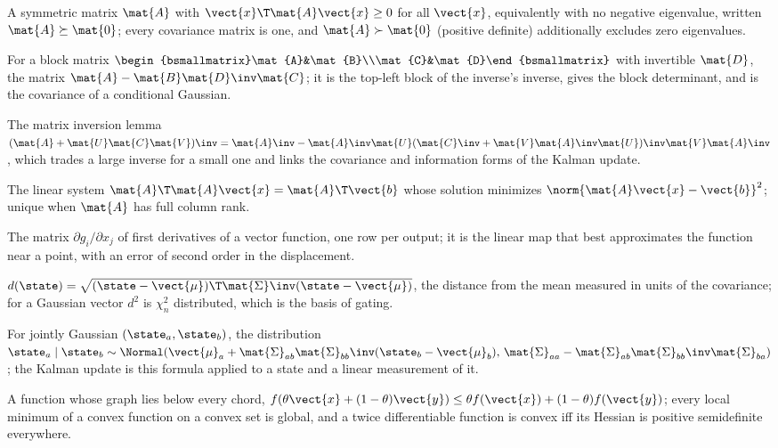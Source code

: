 \item[Positive semidefinite matrix] A symmetric matrix $\mat{A}$ with $\vect{x}\T\mat{A}\vect{x}\ge0$ for all $\vect{x}$, equivalently with no negative eigenvalue, written $\mat{A}\succeq\mat{0}$; every covariance matrix is one, and $\mat{A}\succ\mat{0}$ (positive definite) additionally excludes zero eigenvalues.
\item[Schur complement] For a block matrix $\begin{bsmallmatrix}\mat{A}&\mat{B}\\\mat{C}&\mat{D}\end{bsmallmatrix}$ with invertible $\mat{D}$, the matrix $\mat{A}-\mat{B}\mat{D}\inv\mat{C}$; it is the top-left block of the inverse's inverse, gives the block determinant, and is the covariance of a conditional Gaussian.
\item[Woodbury identity] The matrix inversion lemma $(\mat{A}+\mat{U}\mat{C}\mat{V})\inv=\mat{A}\inv-\mat{A}\inv\mat{U}(\mat{C}\inv+\mat{V}\mat{A}\inv\mat{U})\inv\mat{V}\mat{A}\inv$, which trades a large inverse for a small one and links the covariance and information forms of the Kalman update.
\item[Normal equations] The linear system $\mat{A}\T\mat{A}\vect{x}=\mat{A}\T\vect{b}$ whose solution minimizes $\norm{\mat{A}\vect{x}-\vect{b}}^2$; unique when $\mat{A}$ has full column rank.
\item[Jacobian] The matrix $\partial g_i/\partial x_j$ of first derivatives of a vector function, one row per output; it is the linear map that best approximates the function near a point, with an error of second order in the displacement.
\item[Mahalanobis distance] $d(\state)=\sqrt{(\state-\vect{\mu})\T\mat{\Sigma}\inv(\state-\vect{\mu})}$, the distance from the mean measured in units of the covariance; for a Gaussian vector $d^2$ is $\chi^2_n$ distributed, which is the basis of gating.
\item[Conditional Gaussian] For jointly Gaussian $(\state_a,\state_b)$, the distribution $\state_a\mid\state_b\sim\Normal(\vect{\mu}_a+\mat{\Sigma}_{ab}\mat{\Sigma}_{bb}\inv(\state_b-\vect{\mu}_b),\,\mat{\Sigma}_{aa}-\mat{\Sigma}_{ab}\mat{\Sigma}_{bb}\inv\mat{\Sigma}_{ba})$; the Kalman update is this formula applied to a state and a linear measurement of it.
\item[Convex function] A function whose graph lies below every chord, $f(\theta\vect{x}+(1-\theta)\vect{y})\le\theta f(\vect{x})+(1-\theta)f(\vect{y})$; every local minimum of a convex function on a convex set is global, and a twice differentiable function is convex iff its Hessian is positive semidefinite everywhere.
